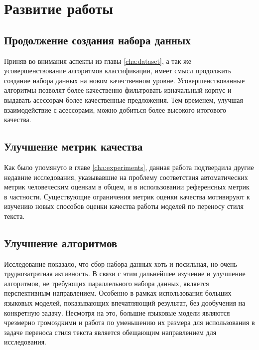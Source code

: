 \label{cha:future}
\chapter{Развитие работы}

\section{Продолжение создания набора данных}
Приняв во внимания аспекты из главы \ref{cha:dataset}, а так же усовершенствование алгоритмов классификации, имеет смысл продолжить создание набора данных на новом качественном уровне.
Усовершенствованные алгоритмы позволят более качественно фильтровать изначальный корпус и выдавать асессорам более качественные предложения.
Тем временем, улучшая взаимодействие с асессорами, можно добиться более высокого итогового качества.

\section{Улучшение метрик качества}
Как было упомянуто в главе \ref{cha:experiments}, данная работа подтвердила другие недавние исследования, указывавшие на проблему соответствия автоматических метрик человеческим оценкам в общем, и в использовании референсных метрик в частности.
Существующие ограничения метрик оценки качества мотивируют к изучению новых способов оценки качества работы моделей по переносу стиля текста.

\section{Улучшение алгоритмов}
Исследование показало, что сбор набора данных хоть и посильная, но очень труднозатратная активность.
В связи с этим дальнейшее изучение и улучшение алгоритмов, не требующих параллельного набора данных, является перспективным направлением.
Особенно в рамках использования больших языковых моделей, показывающих впечатляющий результат, без дообучения на конкретную задачу.
Несмотря на это, большие языковые модели являются чрезмерно громоздкими и работа по уменьшению их размера для использования в задаче переноса стиля текста является обещающим направлением для исследования.

